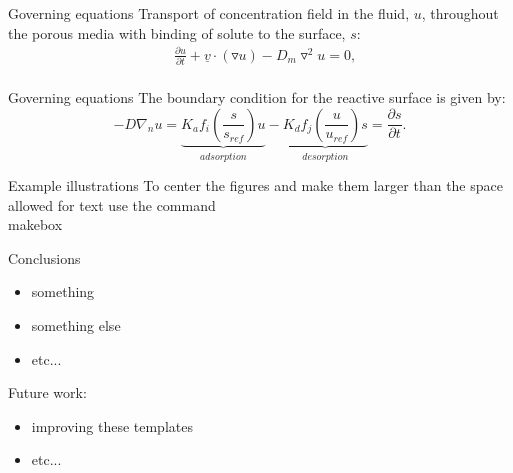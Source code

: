 \documentclass[aspectratio=43]{beamer}
\begin{document}

\begin{frame}{Governing equations}
Transport of concentration field in the fluid, $u$, throughout the porous media with binding of solute to the surface, $s$:
\begin{align*}
&\frac{\partial u}{\partial t} + \underline{v}\cdot\left(\triangledown u\right) - D_{m}\triangledown^{2}u = 0, \\
\label{eq:advdiff_pore}
\end{align*}
\end{frame}

\begin{frame}{Governing equations}
The boundary condition for the reactive surface is given by:
\begin{equation*}
-D \nabla_n u = \underbrace{K_{a} f_{i}\left(\frac{s}{s_{ref}}\right) u}_{adsorption} - \underbrace{K_{d} f_{j}\left(\frac{u}{u_{ref}}\right) s}_{desorption}
= \frac{\partial s}{\partial t}.
\label{eq:BC_gen_f}
\end{equation*}
\end{frame}

\begin{frame}{Example illustrations}
To center the figures and make them larger than the space allowed for text use the command \\makebox
\begin{figure}
\end{figure}
\end{frame}


\begin{frame}{Conclusions}
\begin{itemize}
\item something
\item something else
\item etc... 
\end{itemize}
Future work:
\begin{itemize}
\item improving these templates
\item etc...
\end{itemize}

\end{frame}
\end{document}
